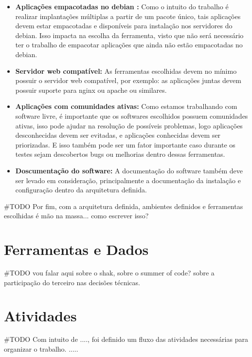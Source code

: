 \begin{itemize}
  \item  \textbf{Aplicações empacotadas no debian :}  Como o intuito do trabalho
  é realizar implantações múltiplas a partir de um pacote único, tais aplicações
  devem estar empacotadas e disponíveis para instalação nos servidores do debian.
  Isso impacta na escolha da ferramenta, visto que não será necessário ter o trabalho
  de empacotar aplicações que ainda não estão empacotadas no debian.
  \item  \textbf{Servidor web compatível:} As ferramentas escolhidas devem no
  mínimo possuir o servidor web compatível, por exemplo: as aplicações juntas
  devem possuir suporte para nginx ou apache ou similares.
  \item  \textbf{Aplicações com comunidades ativas:} Como estamos trabalhando
  com software livre, é importante que os softwares escolhidos possuem comunidades
  ativas, isso pode ajudar na resolução de  possíveis problemas, logo aplicações
  desconhecidas devem ser evitadas, e aplicações conhecidas devem ser priorizadas.
  E isso também pode ser um fator importante caso durante os testes sejam descobertos
  bugs ou melhorias dentro dessas ferramentas.
  \item  \textbf{Doscumentação do software:} A documentação do software também deve
  ser levado em consideração, principalmente a documentação da instalação e configuração
  dentro da arquitetura definida.
\end{itemize}

#TODO
Por fim, com a arquitetura definida, ambientes definidos e ferramentas escolhidas
é mão na massa... como escrever isso?

\section{Ferramentas e Dados}

#TODO
vou falar aqui sobre o shak, sobre o summer of code? sobre a participação do terceiro
nas decisões técnicas.

\section{Atividades}

#TODO
Com intuito de ...., foi definido um fluxo das atividades necessárias para organizar
o trabalho. .....

%
